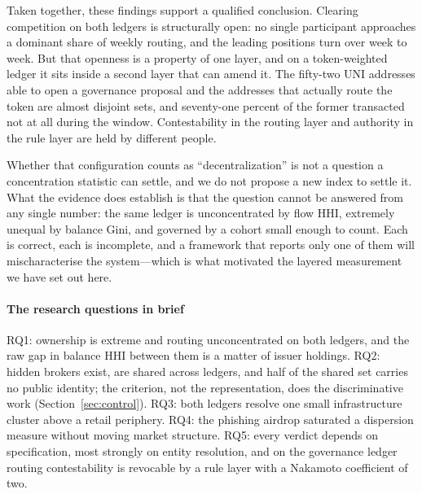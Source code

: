 \documentclass[final,5p,times]{elsarticle}
\begin{document}
Taken together, these findings support a qualified conclusion. Clearing
competition on both ledgers is structurally open: no single participant
approaches a dominant share of weekly routing, and the leading positions turn
over week to week. But that openness is a property of one layer, and on a
token-weighted ledger it sits inside a second layer that can amend it. The
fifty-two UNI addresses able to open a governance proposal and the addresses
that actually route the token are almost disjoint sets, and seventy-one
percent of the former transacted not at all during the window. Contestability
in the routing layer and authority in the rule layer are held by different
people.

Whether that configuration counts as ``decentralization'' is not a question
a concentration statistic can settle, and we do not propose a new index to
settle it. What the evidence does establish is that the question cannot be
answered from any single number: the same ledger is unconcentrated by flow
HHI, extremely unequal by balance Gini, and governed by a cohort small enough
to count. Each is correct, each is incomplete, and a framework that reports
only one of them will mischaracterise the system---which is what motivated
the layered measurement we have set out here.

\paragraph{The research questions in brief}
RQ1: ownership is extreme and routing unconcentrated on both ledgers, and the
raw gap in balance HHI between them is a matter of issuer holdings. RQ2:
hidden brokers exist, are shared across ledgers, and half of the shared set
carries no public identity; the criterion, not the representation, does the
discriminative work (Section~\ref{sec:control}). RQ3: both ledgers resolve
one small infrastructure cluster above a retail periphery. RQ4: the phishing
airdrop saturated a dispersion measure without moving market structure.
RQ5: every verdict depends on specification, most strongly on entity
resolution, and on the governance ledger routing contestability is revocable
by a rule layer with a Nakamoto coefficient of two.
\label{sec:rq}
\end{document}
